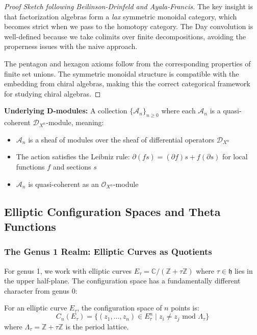 \begin{proof}[Proof Sketch following Beilinson-Drinfeld and Ayala-Francis]
The key insight is that factorization algebras form a \emph{lax} symmetric monoidal category, which becomes 
strict when we pass to the homotopy category. The Day convolution is well-defined because we take colimits 
over finite decompositions, avoiding the properness issues with the naive approach.

The pentagon and hexagon axioms follow from the corresponding properties of finite set unions. The 
symmetric monoidal structure is compatible with the embedding from chiral algebras, making this the 
correct categorical framework for studying chiral algebras.
\end{proof}

\textbf{Underlying D-modules:} A collection $\{\mathcal{A}_n\}_{n \geq 0}$ where each $\mathcal{A}_n$ is a quasi-coherent $\mathcal{D}_{X^n}$-module, meaning:
\begin{itemize}
\item $\mathcal{A}_n$ is a sheaf of modules over the sheaf of differential operators $\mathcal{D}_{X^n}$
\item The action satisfies the Leibniz rule: $\partial(fs) = (\partial f)s + f(\partial s)$ for local functions $f$ and sections $s$
\item $\mathcal{A}_n$ is quasi-coherent as an $\mathcal{O}_{X^n}$-module
\end{itemize}

\subsection{Elliptic Configuration Spaces and Theta Functions}

\subsubsection{The Genus 1 Realm: Elliptic Curves as Quotients}

For genus 1, we work with elliptic curves $E_\tau = \mathbb{C}/(\mathbb{Z} + \tau\mathbb{Z})$ where $\tau \in \mathfrak{h}$ lies in the upper half-plane. The configuration space has a fundamentally different character from genus 0:

\begin{definition}
For an elliptic curve $E_\tau$, the configuration space of $n$ points is:
\[
C_n(E_\tau) = \{(z_1, \ldots, z_n) \in E_\tau^n \mid z_i \neq z_j \text{ mod } \Lambda_\tau\}
\]
where $\Lambda_\tau = \mathbb{Z} + \tau\mathbb{Z}$ is the period lattice.
\end{definition}


